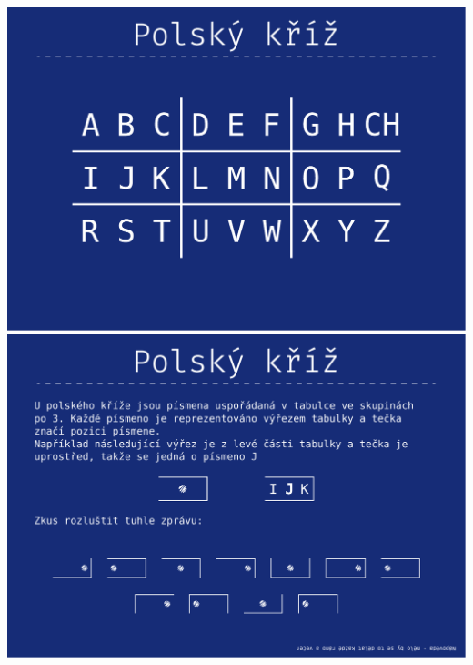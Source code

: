 \documentclass[a4paper]{article}
\begin{document}
	\pagebreak
	\noindent
	\includegraphics[width=\textwidth]{ciphers/polsky_kriz_0.pdf}
	\includegraphics[width=\textwidth]{ciphers/polsky_kriz_1.pdf}
	
\end{document}
